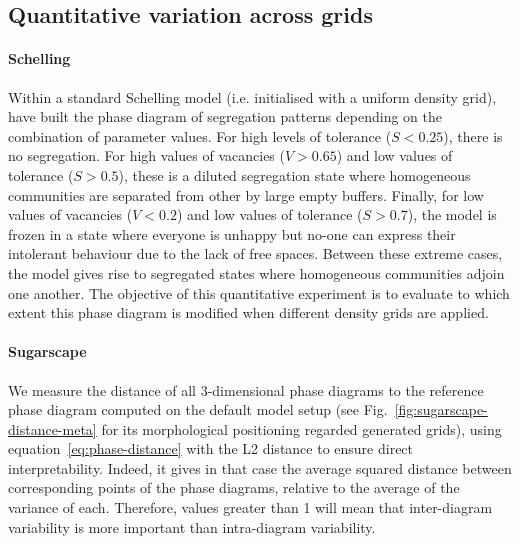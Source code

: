 \documentclass[Afour,sageh,times]{sagej}
\begin{document}
\subsection{Quantitative variation across grids}
\paragraph{Schelling} 
Within a standard Schelling model (i.e. initialised with a uniform density grid), \citet{Gauvinetal2009} have built the phase diagram of segregation patterns depending on the combination of parameter values. For high levels of tolerance ($S < 0.25$), there is no segregation. For high values of vacancies ($V > 0.65$) and low values of tolerance ($S > 0.5$), these is a diluted segregation state where homogeneous communities are separated from other by large empty buffers. Finally, for low values of vacancies ($V < 0.2$) and low values of tolerance ($S > 0.7$), the model is frozen in a state where everyone is unhappy but no-one can express their intolerant behaviour due to the lack of free spaces. Between these extreme cases, the model gives rise to segregated states where homogeneous communities adjoin one another. The objective of this quantitative experiment is to evaluate to which extent this phase diagram is modified when different density grids are applied.  

\paragraph{Sugarscape} We measure the distance of all 3-dimensional phase diagrams to the reference phase diagram computed on the default model setup  (see Fig.~\ref{fig:sugarscape-distance-meta} for its morphological positioning regarded generated grids), using equation~\ref{eq:phase-distance} with the L2 distance to ensure direct interpretability.  Indeed, it gives in that case the average squared distance between corresponding points of the phase diagrams, relative to the average of the variance of each. Therefore, values greater than 1 will mean that inter-diagram variability is more important than intra-diagram variability. 
\end{document}
